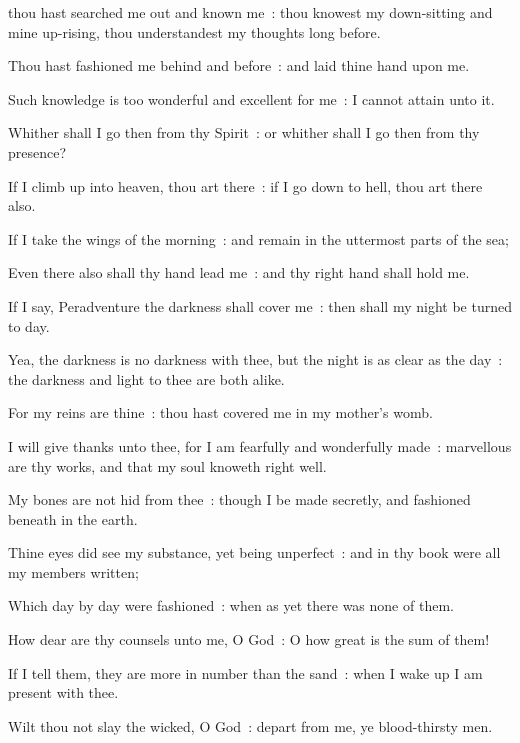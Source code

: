  thou hast searched me out and known me~: thou knowest my down-sitting and mine up-rising, thou understandest my thoughts long before.\par
{}
Thou hast fashioned me behind and before~: and laid thine hand upon me.\par
{}Such knowledge is too wonderful and excellent for me~: I cannot attain unto it.\par
{}Whither shall I go then from thy Spirit~: or whither shall I go then from thy presence?\par
{}If I climb up into heaven, thou art there~: if I go down to hell, thou art there also.\par
{}If I take the wings of the morning~: and remain in the uttermost parts of the sea;\par
{}Even there also shall thy hand lead me~: and thy right hand shall hold me.\par
{}If I say, Peradventure the darkness shall cover me~: then shall my night be turned to day.\par
{}Yea, the darkness is no darkness with thee, but the night is as clear as the day~: the darkness and light to thee are both alike.\par
{}For my reins are thine~: thou hast covered me in my mother's womb.\par
{}I will give thanks unto thee, for I am fearfully and wonderfully made~: marvellous are thy works, and that my soul knoweth right well.\par
{}My bones are not hid from thee~: though I be made secretly, and fashioned beneath in the earth.\par
{}Thine eyes did see my substance, yet being unperfect~: and in thy book were all my members written;\par
{}Which day by day were fashioned~: when as yet there was none of them.\par
{}How dear are thy counsels unto me, O God~: O how great is the sum of them!\par
{}If I tell them, they are more in number than the sand~: when I wake up I am present with thee.\par
{}Wilt thou not slay the wicked, O God~: depart from me, ye blood-thirsty men.\par
